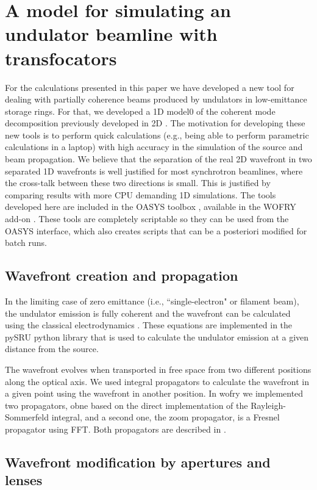 \documentclass{iucr}              %
\begin{document}
\section{A model for simulating an undulator beamline with transfocators}

For the calculations presented in this paper we have developed a new tool for dealing with partially coherence beams produced by undulators in low-emittance storage rings. For that, we developed a 1D model0 of the coherent mode decomposition previously developed in 2D \cite{XX}. The motivation for developing these new tools is to perform quick calculations (e.g., being able to perform parametric calculations in a laptop) with high accuracy in the simulation of the source and beam propagation. We believe that the separation of the real 2D wavefront in two separated 1D wavefronts is well justified for most synchrotron beamlines, where the cross-talk between these two directions is small. This is justified by comparing results with more CPU demanding 1D simulations. The tools developed here are included in the OASYS toolbox \cite{XX}, available in the WOFRY add-on \cite{XX}. These tools are completely scriptable so they can be used from the OASYS interface, which also creates scripts that can be a posteriori modified for batch runs. 
 

\subsection{Wavefront creation and propagation}

In the limiting case of zero emittance (i.e., ``single-electron" or filament beam), the undulator emission is fully coherent and the wavefront can be calculated using the classical electrodynamics \cite{XX}. These equations are implemented in the pySRU python library \cite{XX} that is used to calculate the undulator emission at a given distance from the source. 

The wavefront evolves when transported in free space from two different positions along the optical axis. We used integral propagators to calculate the wavefront in a given point using the wavefront in another position. In wofry we implemented two propagators, obne based on the direct implementation of the  Rayleigh-Sommerfeld integral, and a second one, the zoom propagator, is a Fresnel propagator using FFT. Both propagators are described in \cite{XX}.


\subsection{Wavefront modification by apertures and lenses}
\end{document}
